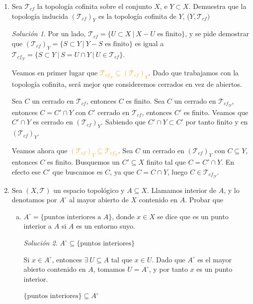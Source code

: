 \documentclass[12pt,twoside]{report}
\newcommand\mc[1]{\mathcal{#1}}
\theoremstyle{azul}
\theoremstyle{azul2}
\theoremstyle{plain}
\theoremstyle{definition}
\theoremstyle{remark}
\newtheorem*{sol}{Solución}
\begin{document}
\begin{enumerate}
    \item \justifying Sea $\mc{T}_{cf}$ la topología cofinita sobre el conjunto $X$, e $Y \subset X$. Demuestra que la topología inducida $(\mc{T}_{cf})_Y$ es la topología cofinita de $Y$, ($Y, \mc{T}_{cf})$
    \begin{sol}
    Por un lado, $\mc{T}_{cf}=\{U \subset X \: | \: X - U \text{ es finito}\}$, y se pide demostrar que $(\mc{T}_{cf})_Y=\{S \subset Y \: | \: Y-S \text{ es finito}\}$ es igual a $\mc{T}_{cf_{|Y}}=\{S \subset Y \: | \: S = U \cap Y \: | \: U \in \mc{T}_{cf}\}$.
    
    Veamos en primer lugar que \textcolor{orange}{$\mc{T}_{cf_{|Y}}\subseteq (\mc{T}_{cf})_Y$}. Dado que trabajamos con la topología cofinita, será mejor que consideremos cerrados en vez de abiertos. 
    
    Sea $C$ un cerrado en $\mc{T}_{cf}$, entonces $C$ es finito. Sea $C$ un cerrado en $\mc{T}_{cf_{|Y}}$, entonces $C=C' \cap Y$ con $C'$ cerrado en $\mc{T}_{cf}$, entonces $C'$ es finito. Veamos que $C' \cap Y$ es cerrado en $(\mc{T}_{cf})_Y$. Sabiendo que $C'\cap Y \subset C'$ por tanto finito y en $(\mc{T}_{cf})_Y$. 
    
     Veamos ahora que \textcolor{orange}{$(\mc{T}_{cf})_Y \subseteq \mc{T}_{cf_{|Y}}$}. Sea $C$ un cerrado en $(\mc{T}_{cf})_Y$ con $C \subseteq Y$, entonces $C$ es finito. Busquemos un $C' \subseteq X$ finito tal que $C=C'\cap Y$. En efecto ese $C'$ que buscamos es $C$, ya que $C=C \cap Y$, luego $C \in \mc{T}_{cf_{|Y}}$. 
    \end{sol}
    \item Sea $(X, \mc{T})$ un espacio topológico y $A \subseteq X$. Llamamos interior de $A$, y lo denotamos por $A^{\circ}$ al mayor abierto de $X$ contenido en $A$. Probar que 
\begin{enumerate}[a)]
    \item $A^{\circ}=\{ \text{puntos interiores a } A\}$, donde $x \in X$ se dice que es un punto interior a $A$ si $A$ es un entorno suyo.
    \begin{sol}\: 
    
    \underline{$A
    ^{\circ} \subseteq \{\text{puntos interiores}\}$}
    
    Si $x \in A^{\circ}$, entonces $\exists
    \: U \subseteq A$ tal que $x \in U$. Dado que $A^{\circ}$ es el mayor abierto contenido en $A$, tomamos $U=A^{\circ}$, y por tanto $x$ es un punto interior.
    
    \underline{$\{\text{puntos interiores}\} \subseteq A
    ^{\circ}$}
    

\end{sol}
\end{enumerate}
\end{enumerate}
\end{document}
